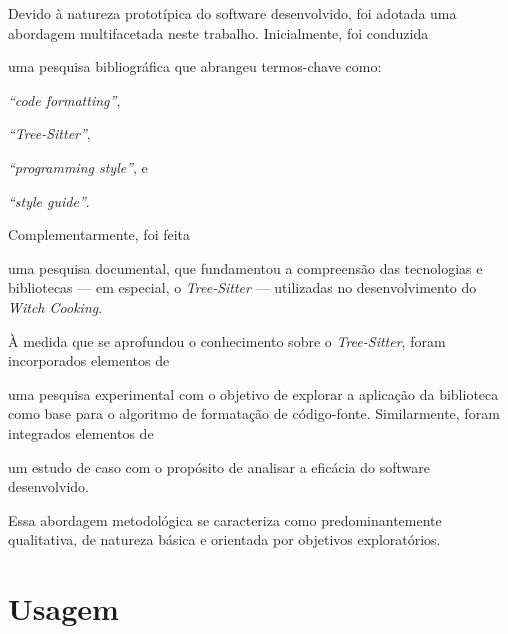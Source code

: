 \documentclass
  [11pt,a4paper,english,brazil,openright,sumario=tradicional,twoside]
  {abntex2}
\newcommand{\treesitter}{\textit{Tree-Sitter}\xspace}
\newcommand{\witchcooking}{\textit{Witch Cooking}\xspace}
\begin{document}
  Devido à natureza prototípica do software desenvolvido, foi adotada uma
  abordagem multifacetada neste trabalho. Inicialmente, foi conduzida
  \begin{inparaenum}
    \item uma pesquisa bibliográfica que abrangeu termos-chave como:
          \begin{inparaenum}
            \item \textit{``code formatting''},
            \item \textit{``Tree-Sitter''},
            \item \textit{``programming style''}, e
            \item \textit{``style guide''}.
          \end{inparaenum}
          Complementarmente, foi feita
    \item uma pesquisa documental, que fundamentou a compreensão das
          tecnologias e bibliotecas --- em especial, o \treesitter{} ---
          utilizadas no desenvolvimento do \witchcooking.

          À medida que se aprofundou o conhecimento sobre o \treesitter, foram
          incorporados elementos de
    \item uma pesquisa experimental com o objetivo de explorar a aplicação da
          biblioteca como base para o algoritmo de formatação de código-fonte.
          Similarmente, foram integrados elementos de
    \item um estudo de caso com o propósito de analisar a eficácia do software
          desenvolvido.
  \end{inparaenum}
  Essa abordagem metodológica se caracteriza como predominantemente
  qualitativa, de natureza básica e orientada por objetivos exploratórios.


  \section{Usagem}
  \label{section:usage}
\end{document}
